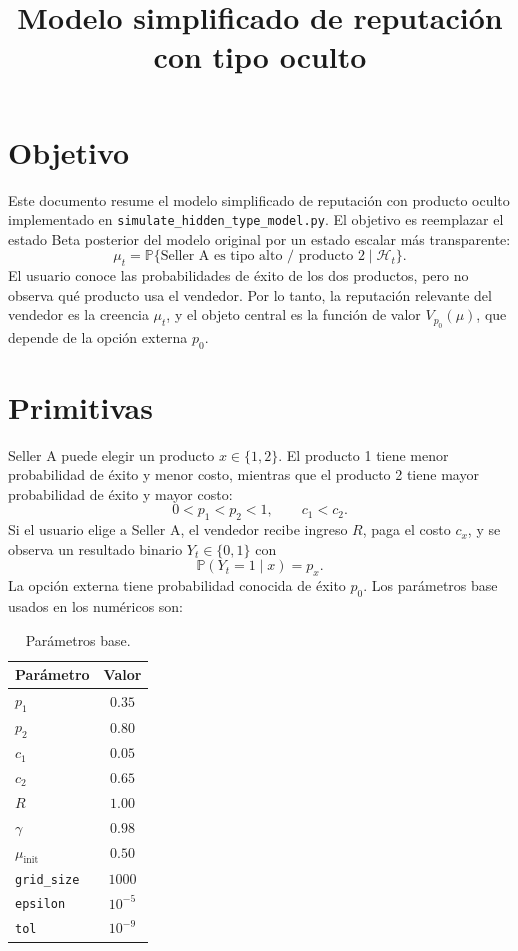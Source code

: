 \documentclass[11pt]{article}
\title{Modelo simplificado de reputación con tipo oculto}
\author{}
\date{}
\begin{document}
\maketitle

\section{Objetivo}

Este documento resume el modelo simplificado de reputación con producto oculto
implementado en \texttt{simulate\_hidden\_type\_model.py}. El objetivo es
reemplazar el estado Beta posterior del modelo original por un estado escalar
más transparente:
\[
\mu_t
= \mathbb{P}\{\text{Seller A es tipo alto / producto 2}\mid \mathcal{H}_t\}.
\]
El usuario conoce las probabilidades de éxito de los dos productos, pero no
observa qué producto usa el vendedor. Por lo tanto, la reputación relevante del
vendedor es la creencia \(\mu_t\), y el objeto central es la función de valor
\(V_{p_0}(\mu)\), que depende de la opción externa \(p_0\).

\section{Primitivas}

Seller A puede elegir un producto \(x\in\{1,2\}\). El producto 1 tiene menor
probabilidad de éxito y menor costo, mientras que el producto 2 tiene mayor
probabilidad de éxito y mayor costo:
\[
0<p_1<p_2<1,
\qquad
c_1<c_2.
\]
Si el usuario elige a Seller A, el vendedor recibe ingreso \(R\), paga el costo
\(c_x\), y se observa un resultado binario \(Y_t\in\{0,1\}\) con
\[
\mathbb{P}(Y_t=1\mid x)=p_x.
\]
La opción externa tiene probabilidad conocida de éxito \(p_0\). Los parámetros
base usados en los numéricos son:

\begin{table}[H]
\centering
\begin{tabular}{lc}
\toprule
Parámetro & Valor \\
\midrule
\(p_1\) & \(0.35\) \\
\(p_2\) & \(0.80\) \\
\(c_1\) & \(0.05\) \\
\(c_2\) & \(0.65\) \\
\(R\) & \(1.00\) \\
\(\gamma\) & \(0.98\) \\
\(\mu_{\mathrm{init}}\) & \(0.50\) \\
\texttt{grid\_size} & \(1000\) \\
\texttt{epsilon} & \(10^{-5}\) \\
\texttt{tol} & \(10^{-9}\) \\
\bottomrule
\end{tabular}
\caption{Parámetros base.}
\label{tab:parameters}
\end{table}
\end{document}
